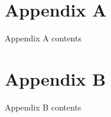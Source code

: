 \documentclass[9pt]{beamer}
\begin{document}

\section{Appendix A}


\begin{frame}{Appendix A contents}
\label{appendixA}

\lipsum[1-1]

\end{frame}


\section{Appendix B}


\begin{frame}{Appendix B contents}

\lipsum[1-1]

\end{frame}

\end{document}
